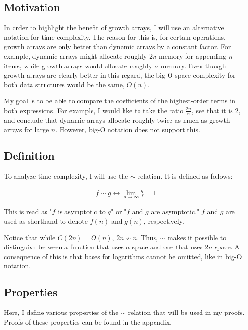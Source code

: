 \subsection{Motivation}

In order to highlight the benefit of growth arrays, I will use an alternative notation for time complexity. The reason for this is, for certain operations, growth arrays are only better than dynamic arrays by a constant factor. For example, dynamic arrays might allocate roughly $2n$ memory for appending $n$ items, while growth arrays would allocate roughly $n$ memory. Even though growth arrays are clearly better in this regard, the big-O space complexity for both data structures would be the same, $O(n)$.

My goal is to be able to compare the coefficients of the highest-order terms in both expressions. For example, I would like to take the ratio $\frac{2n}{n}$, see that it is $2$, and conclude that dynamic arrays allocate roughly twice as much as growth arrays for large $n$. However, big-O notation does not support this.

\subsection{Definition}

To analyze time complexity, I will use the $\sim$ relation. It is defined as follows:

\begin{align*}
f \sim g \leftrightarrow \lim_{n \to \infty} \frac{g}{f} = 1
\end{align*}

This is read as "$f$ is asymptotic to $g$" or "$f$ and $g$ are asymptotic." {\HdrNote} $f$ and $g$ are used as shorthand to denote $f(n)$ and $g(n)$, respectively.

Notice that while $O(2n) = O(n)$, $2n \not\sim n$. Thus, $\sim$ makes it possible to distinguish between a function that uses $n$ space and one that uses $2n$ space. {\HdrNote} A consequence of this is that bases for logarithms cannot be omitted, like in big-O notation.

\subsection{Properties}
\label{subsec:AsymptoticProperties}

Here, I define various properties of the $\sim$ relation that will be used in my proofs. Proofs of these properties can be found in the appendix.

